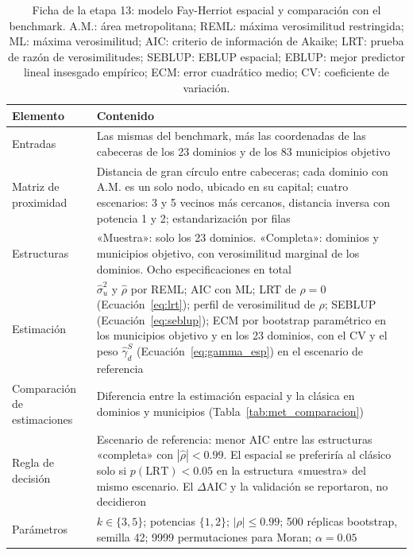 \begin{table}[!htbp]
\centering
\small
\caption[Ficha de la etapa 13: modelo Fay-Herriot espacial y comparación con el benchmark]{Ficha de la etapa 13: modelo Fay-Herriot espacial y comparación con el benchmark. A.M.: área metropolitana; REML: máxima verosimilitud restringida; ML: máxima verosimilitud; AIC: criterio de información de Akaike; LRT: prueba de razón de verosimilitudes; SEBLUP: EBLUP espacial; EBLUP: mejor predictor lineal insesgado empírico; ECM: error cuadrático medio; CV: coeficiente de variación.}
\label{tab:met_espacial}
\renewcommand{\arraystretch}{1.15}
\begin{tabularx}{\linewidth}{>{\raggedright\arraybackslash}p{2.8cm} >{\raggedright\arraybackslash}X}
\toprule
Elemento & Contenido \\
\midrule
Entradas & Las mismas del benchmark, más las coordenadas de las cabeceras de los 23 dominios y de los 83 municipios objetivo \\
Matriz de proximidad & Distancia de gran círculo entre cabeceras; cada dominio con A.M. es un solo nodo, ubicado en su capital; cuatro escenarios: 3 y 5 vecinos más cercanos, distancia inversa con potencia 1 y 2; estandarización por filas \\
Estructuras & «Muestra»: solo los 23 dominios. «Completa»: dominios y municipios objetivo, con verosimilitud marginal de los dominios. Ocho especificaciones en total \\
Estimación & $\hat{\sigma}_u^2$ y $\hat{\rho}$ por REML; AIC con ML; LRT de $\rho = 0$ (Ecuación~\ref{eq:lrt}); perfil de verosimilitud de $\rho$; SEBLUP (Ecuación~\ref{eq:seblup}); ECM por bootstrap paramétrico en los municipios objetivo y en los 23 dominios, con el CV y el peso $\hat{\gamma}^{S}_d$ (Ecuación~\ref{eq:gamma_esp}) en el escenario de referencia \\
Comparación de estimaciones & Diferencia entre la estimación espacial y la clásica en dominios y municipios (Tabla~\ref{tab:met_comparacion}) \\
Regla de decisión & Escenario de referencia: menor AIC entre las estructuras «completa» con $|\hat{\rho}| < 0.99$. El espacial se preferiría al clásico solo si $p(\text{LRT}) < 0.05$ en la estructura «muestra» del mismo escenario. El $\Delta$AIC y la validación se reportaron, no decidieron \\
Parámetros & $k \in \{3, 5\}$; potencias $\{1, 2\}$; $|\rho| \leq 0.99$; 500 réplicas bootstrap, semilla 42; \num{9999} permutaciones para Moran; $\alpha = 0.05$ \\

\end{tabularx}
\end{table}
